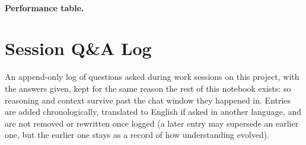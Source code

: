 \documentclass[11pt]{article}
\begin{document}
\paragraph{Performance table.}

\section{Session Q\&A Log}
\label{sec:qa-log}

An append-only log of questions asked during work sessions on this
project, with the answers given, kept for the same reason the rest of
this notebook exists: so reasoning and context survive past the chat
window they happened in. Entries are added chronologically, translated
to English if asked in another language, and are not removed or
rewritten once logged (a later entry may supersede an earlier one, but
the earlier one stays as a record of how understanding evolved).
\end{document}
